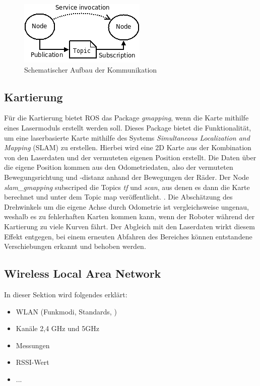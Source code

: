 \documentclass{scrartcl}%
\begin{document}
\begin{figure}
	\centering
	\includegraphics{bilder/ROS_concepts.png}
	\caption{Schematischer Aufbau der Kommunikation \cite{rosKonzept}}
	\label{concept}
\end{figure}

\subsection{Kartierung}
Für die Kartierung bietet ROS das Package \textit{gmapping}, wenn die Karte mithilfe eines Lasermoduls erstellt werden soll. Dieses Package bietet die Funktionalität, um eine laserbasierte Karte mithilfe des Systems \textit{Simultaneous Localization and Mapping} (SLAM) zu erstellen. Hierbei wird eine 2D Karte aus der Kombination von den Laserdaten und der vermuteten eigenen Position erstellt. Die Daten über die eigene Position kommen aus den Odometriedaten, also der vermuteten Bewegungsrichtung und -distanz anhand der Bewegungen der Räder. Der Node \textit{slam\_gmapping} subscriped die Topics \textit{tf} und \textit{scan}, aus denen es dann die Karte berechnet und unter dem Topic map veröffentlicht. \cite{gmap}. Die Abschätzung des Drehwinkels um die eigene Achse durch Odometrie ist vergleichsweise ungenau, weshalb es zu fehlerhaften Karten kommen kann, wenn der Roboter während der Kartierung zu viele Kurven fährt. Der Abgleich mit den Laserdaten wirkt diesem Effekt entgegen, bei einem erneuten Abfahren des Bereiches können entstandene Verschiebungen erkannt und behoben werden.

\subsection{Wireless Local Area Network}
In dieser Sektion wird folgendes erklärt:
\begin{itemize}
	\item WLAN (Funkmodi, Standards, )
	\item Kanäle 2,4 GHz und 5GHz
	\item Messungen
	\item RSSI-Wert
	\item ...
\end{itemize}
\end{document}
